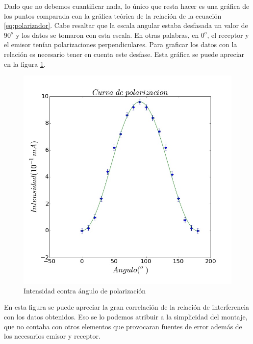\documentclass[%
 reprint,
 amsmath,amssymb,
 aps,
]{revtex4-1}
\begin{document}
Dado que no debemos cuantificar nada, lo único que resta hacer es una gráfica de los puntos comparada con la gráfica teórica de la relación de la ecuación \ref{eq:polarizador}. Cabe resaltar que la escala angular estaba desfasada un valor de $90^o$ y los datos se tomaron con esta escala. En otras palabras, en $0^o$, el receptor y el emisor tenían polarizaciones perpendiculares. Para graficar los datos con la relación es necesario tener en cuenta este desfase. Esta gráfica se puede apreciar en la figura \ref{fig:polarizador1}. \\


\begin{figure}[h!]
\centering
\includegraphics[width=0.8\linewidth]{polarizador1}
\caption{Intensidad contra ángulo de polarización}
\label{fig:polarizador1}
\end{figure}

En esta figura se puede apreciar la gran correlación de la relación de interferencia con los datos obtenidos. Eso se lo podemos atribuir a la simplicidad del montaje, que no contaba con otros elementos que provocaran fuentes de error además de los necesarios emisor y receptor.\\
\end{document}

